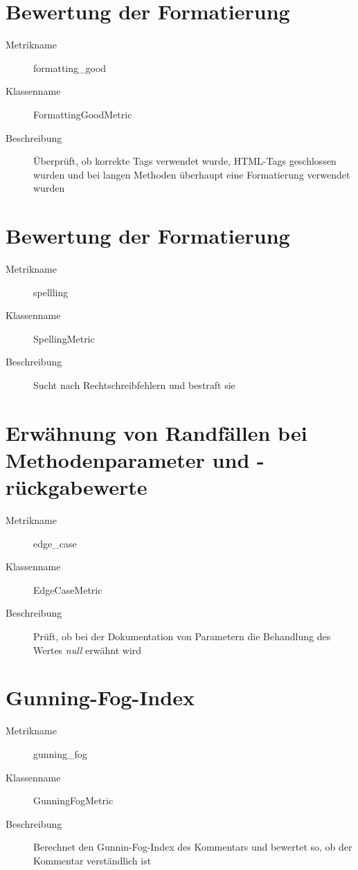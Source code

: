 \begin{appendices}
\section{Bewertung der Formatierung}
\begin{description}
    \item [Metrikname]  formatting\_good
    \item [Klassenname] FormattingGoodMetric
    \item[Beschreibung] Überprüft, ob korrekte Tags verwendet wurde, HTML-Tags geschlossen wurden und bei langen Methoden überhaupt eine Formatierung verwendet wurden
\end{description}


\section{Bewertung der Formatierung}
\begin{description}
    \item [Metrikname]  spellling
    \item [Klassenname] SpellingMetric
    \item[Beschreibung]Sucht nach Rechtschreibfehlern und bestraft sie
\end{description}

\section{Erwähnung von Randfällen bei Methodenparameter
und -rückgabewerte}
\begin{description}
    \item [Metrikname]  edge\_case
    \item [Klassenname] EdgeCaseMetric
    \item[Beschreibung] Prüft, ob bei der Dokumentation von Parametern die Behandlung des Wertes \textit{null} erwähnt wird
\end{description}


\section{Gunning-Fog-Index}
\begin{description}
    \item [Metrikname]  gunning\_fog
    \item [Klassenname] GunningFogMetric
    \item[Beschreibung] Berechnet den Gunnin-Fog-Index des Kommentars und bewertet so, ob der Kommentar verständlich ist
\end{description}
 


\end{appendices}
